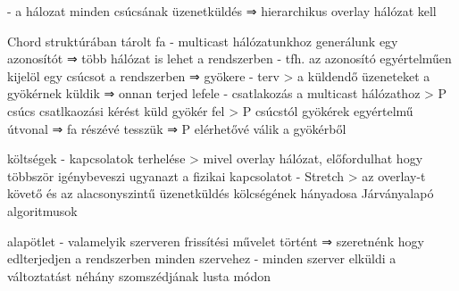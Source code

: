 \documentclass[12pt]{article}
\begin{document}
\begin{description}
                                                                        - a hálozat minden csúcsának üzenetküldés
                                                                        ⇒ hierarchikus overlay hálózat kell
                                                                    \item Chord struktúrában tárolt fa
                                                                        - multicast hálózatunkhoz generálunk egy azonosítót ⇒ több hálózat is lehet a rendszerben
                                                                        - tfh. az azonosító egyértelműen kijelöl egy csúcsot a rendszerben ⇒ gyökere
                                                                        - terv
                                                                        > a küldendő üzeneteket a gyökérnek küldik ⇒ onnan terjed lefele
                                                                        - csatlakozás a multicast hálózathoz
                                                                        > P csúcs csatlkaozási kérést küld gyökér fel
                                                                        > P csúcstól gyökérek egyértelmű útvonal ⇒ fa részévé tesszük
                                                                        ⇒ P elérhetővé válik a gyökérből
                                                                    \item költségek
                                                                        - kapcsolatok terhelése
                                                                        > mivel overlay hálózat, előfordulhat hogy többször igénybeveszi ugyanazt a fizikai kapcsolatot
                                                                        - Stretch 
                                                                        > az overlay-t követő és az alacsonyszintű üzenetküldés kölcségének hányadosa
                                                                        Járványalapó algoritmusok
                                                                    \item alapötlet
                                                                        - valamelyik szerveren frissítési művelet történt 
                                                                        ⇒ szeretnénk hogy edlterjedjen a rendszerben minden szervehez
                                                                        - minden szerver elküldi a változtatást néhány szomszédjának lusta módon

\end{description}
\end{document}

